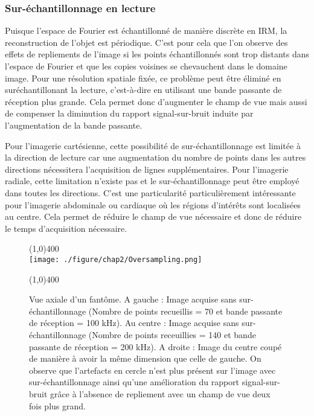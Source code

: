 \subsubsection{Sur-échantillonnage en lecture}

Puisque l'espace de Fourier est échantillonné de manière discrète en IRM, la reconstruction de l'objet est périodique. C'est pour cela que l'on observe des effets de repliements de l'image si les points échantillonnés sont trop distants dans l'espace de Fourier et que les copies voisines se chevauchent dans le domaine image. Pour une résolution spatiale fixée, ce problème peut être éliminé en suréchantillonant la lecture, c'est-à-dire en utilisant une bande passante de réception plus grande. Cela permet donc d'augmenter le champ de vue mais aussi de compenser la diminution du rapport signal-sur-bruit induite par l'augmentation de la bande passante.

Pour l'imagerie cartésienne, cette possibilité de sur-échantillonnage est limitée à la direction de lecture car une augmentation du nombre de points dans les autres directions nécessitera l'acquisition de lignes supplémentaires. Pour l'imagerie radiale, cette limitation n'existe pas et le sur-échantillonnage peut être employé dans toutes les directions. C'est une particularité particulièrement  intéressante pour l'imagerie abdominale ou cardiaque \cite{block2014towards,Johnson:2012uq} où les régions d'intérêts sont localisées au centre. Cela permet de réduire le champ de vue nécessaire et donc de réduire le temps d'acquisition nécessaire.

\begin{figure}[H]
\centering
\line(1,0){400} \\
\texttt{[image: ./figure/chap2/Oversampling.png]}
\caption[artefact de flux]{\label{fig:Oversampling} Vue axiale d'un fantôme. A gauche : Image acquise sans sur-échantillonnage (Nombre de points recueillis = 70 et bande passante de réception = 100 kHz). Au centre : Image acquise sans sur-échantillonnage (Nombre de points receuillies = 140 et bande passante de réception = 200 kHz). A droite : Image du centre coupé de manière à avoir la même dimension que celle de gauche. On observe que l'artefacts en cercle n'est plus présent sur l'image avec sur-échantillonnage ainsi qu'une amélioration du rapport signal-sur-bruit grâce à l'absence de repliement avec un champ de vue deux fois plus grand.}
\line(1,0){400} \\
\end{figure}

